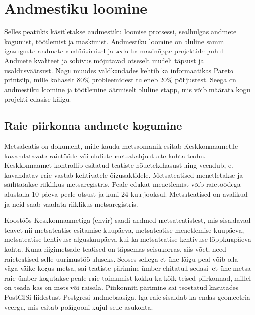 \section{Andmestiku loomine}
Selles peatükis käsitletakse andmestiku loomise protsessi, sealhulgas andmete kogumist, töötlemist ja maskimist. Andmestiku loomine on oluline samm igasuguste andmete analüüsimisel ja seda ka masinõppe projektide puhul. Andmete kvaliteet ja sobivus mõjutavad otseselt mudeli täpsust ja usaldusväärsust. Nagu muudes valdkondades kehtib ka informaatikas Pareto printsiip, mille kohaselt 80\% probleemidest tuleneb 20\% põhjustest. Seega on andmestiku loomine ja töötlemine äärmiselt oluline etapp, mis võib määrata kogu projekti edasise käigu.

\subsection{Raie piirkonna andmete kogumine}
Metsateatis on dokument, mille kaudu metsaomanik esitab Keskkonnaametile
kavandatavate raietööde või oluliste metsakahjustuste kohta teabe. Keskkonnaamet
kontrollib esitatud teatiste nõuetekohasust ning veendub, et kavandatav raie
vastab kehtivatele õigusaktidele. Metsateatised menetletakse ja säilitatakse
riiklikus metsaregistris. Peale edukat menetlemist võib raietöödega alustada 10 päeva peale otsust ja kuni 24 kuu jooksul. \cite{MetsateatisJaMetsaregister} Metsateatised on avalikud ja neid saab vaadata riiklikus metsaregistris.

Koostöös Keskkonnaametiga (envir) saadi andmed metsateatistest, mis sisaldavad teavet nii metsateatise esitamise kuupäeva, metsateatise menetlemise kuupäeva, metsateatise kehtivuse alguskuupäeva kui ka metsateatise kehtivuse lõppkuupäeva kohta. Kuna riigimetsade teatised on täpsemas seisukorras, siis võeti need raieteatised selle uurimustöö aluseks. Seoses sellega et ühe lõigu peal võib olla väga väike kogus metsa, sai teatiste pärimine ümber ehitatud sedasi, et ühe metsa raie ümber kogutakse peale raie toimumist kokku ka kõik teised piirkonnad, millel on teada kas on mets või raieala. Piirkonniti pärimine sai teostatud kasutades PostGISi liidestust Postgresi andmebaasiga. Iga raie sisaldab ka endas geomeetria veergu, mis esitab polügooni kujul selle asukohta.


